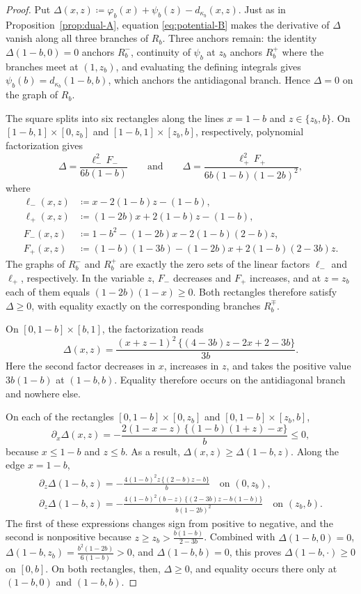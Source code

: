 \documentclass[11pt,a4paper]{article}
\theoremstyle{remark}
\newcommand{\1}{\mathbf{1}}
\begin{document}
\begin{proof}
Put $\Delta(x,z)\coloneqq\varphi_b(x)+\psi_b(z)-d_{\kappa_b}(x,z)$.
Just as in Proposition~\ref{prop:dual-A}, equation \eqref{eq:potential-B} makes the derivative of $\Delta$ vanish along all three branches of $R_b$.
Three anchors remain: the identity $\Delta(1-b,0)=0$ anchors $R_b^-$, continuity of $\psi_b$ at $z_b$ anchors $R_b^+$ where the branches meet at $(1,z_b)$, and evaluating the defining integrals gives $\psi_b(b)=d_{\kappa_b}(1-b,b)$, which anchors the antidiagonal branch.
Hence $\Delta=0$ on the graph of $R_b$.

The square splits into six rectangles along the lines $x=1-b$ and $z\in\{z_b,b\}$.
On $[1-b,1]\times[0,z_b]$ and $[1-b,1]\times[z_b,b]$, respectively, polynomial factorization gives
\[
  \Delta=\frac{\ell_-^2\,F_-}{6b(1-b)}
  \qquad\text{and}\qquad
  \Delta=\frac{\ell_+^2\,F_+}{6b(1-b)(1-2b)^2},
\]
where
\[
  \begin{aligned}
  \ell_-(x,z)&\coloneqq x-2(1-b)z-(1-b),\\
  \ell_+(x,z)&\coloneqq(1-2b)x+2(1-b)z-(1-b),\\
  F_-(x,z)&\coloneqq1-b^2-(1-2b)x-2(1-b)(2-b)z,\\
  F_+(x,z)&\coloneqq(1-b)(1-3b)-(1-2b)x+2(1-b)(2-3b)z.
  \end{aligned}
\]
The graphs of $R_b^-$ and $R_b^+$ are exactly the zero sets of the linear factors $\ell_-$ and $\ell_+$, respectively.
In the variable $z$, $F_-$ decreases and $F_+$ increases, and at $z=z_b$ each of them equals $(1-2b)(1-x)\ge0$.
Both rectangles therefore satisfy $\Delta\ge0$, with equality exactly on the corresponding branches $R_b^\mp$.

On $[0,1-b]\times[b,1]$, the factorization reads
\[
  \Delta(x,z)=\frac{(x+z-1)^2\,\bigl\{(4-3b)z-2x+2-3b\bigr\}}{3b}.
\]
Here the second factor decreases in $x$, increases in $z$, and takes the positive value $3b(1-b)$ at $(1-b,b)$.
Equality therefore occurs on the antidiagonal branch and nowhere else.

On each of the rectangles $[0,1-b]\times[0,z_b]$ and $[0,1-b]\times[z_b,b]$,
\[
  \partial_x\Delta(x,z)=-\frac{2(1-x-z)\,\bigl\{(1-b)(1+z)-x\bigr\}}{b}\le0,
\]
because $x\le1-b$ and $z\le b$.
As a result, $\Delta(x,z)\ge\Delta(1-b,z)$.
Along the edge $x=1-b$,
\begin{gather*}
  \partial_z\Delta(1-b,z)=-\frac{4(1-b)^2z\,\bigl\{(2-b)z-b\bigr\}}{b}
  \quad\text{on }(0,z_b),\\
  \partial_z\Delta(1-b,z)=-\frac{4(1-b)^2(b-z)\,\bigl\{(2-3b)z-b(1-b)\bigr\}}{b(1-2b)^2}
  \quad\text{on }(z_b,b).
\end{gather*}
The first of these expressions changes sign from positive to negative, and the second is nonpositive because $z\ge z_b>\frac{b(1-b)}{2-3b}$.
Combined with $\Delta(1-b,0)=0$, $\Delta(1-b,z_b)=\frac{b^2(1-2b)}{6(1-b)}>0$, and $\Delta(1-b,b)=0$, this proves $\Delta(1-b,\cdot)\ge0$ on $[0,b]$.
On both rectangles, then, $\Delta\ge0$, and equality occurs there only at $(1-b,0)$ and $(1-b,b)$.


\end{proof}
\end{document}
